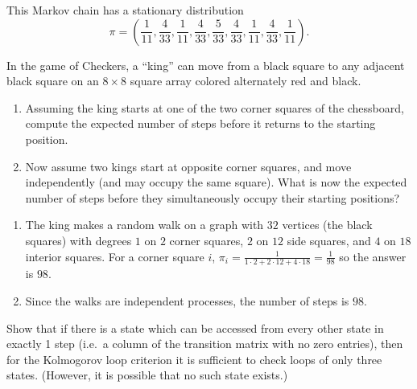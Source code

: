 \documentclass[12pt]{article}
\begin{document}
\begin{solution}
    This Markov chain has a stationary distribution
    \[
        \pi = (\frac{1}{11}, \frac{4}{33}, \frac{1}{11}, \frac{4}{33},
        \frac{5}{33}, \frac{4}{33}, \frac{1}{11}, \frac{4}{33}, \frac{1}
        {11}).
    \]
\end{solution}

\begin{exercise}
    In the game of Checkers, a ``king'' can move from a black square to
    any adjacent black square on an \( 8 \times 8 \) square array
    colored alternately red and black.
    \begin{enumerate}
    \item
        Assuming the king starts at one of the two corner squares of
        the chessboard, compute the expected number of steps before it
        returns to the starting position.
    \item
        Now assume two kings start at opposite corner squares, and move
        independently (and may occupy the same square).  What is now the
        expected number of steps before they simultaneously occupy their
        starting positions?
\end{enumerate}
\end{exercise}
\begin{solution}
    \begin{enumerate}
    \item
        The king makes a random walk on a graph with \( 32 \) vertices (the
        black squares) with degrees \( 1 \) on \( 2 \) corner squares, \(
        2 \) on \( 12 \) side squares, and \( 4 \) on \( 18 \) interior
        squares.  For a corner square \( i \), \( \pi_i = \frac{1}{1
        \cdot 2+ 2 \cdot 12 + 4 \cdot 18} = \frac{1}{98} \) so the
        answer is \( 98 \).
    \item
        Since the walks are independent processes, the number of steps
        is \( 98 \).
\end{enumerate}
\end{solution}

\begin{exercise}
    Show that if there is a state which can be accessed from every other
    state in exactly 1 step (i.e.\ a column of the transition matrix
    with no zero entries), then for the Kolmogorov loop criterion it is
    sufficient to check loops of only three states.  (However, it is
    possible that no such state exists.)
\end{exercise}
\begin{solution}

\end{solution}
\hr
\end{document}
